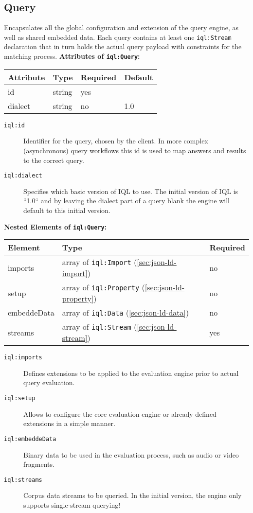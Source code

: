 \documentclass[11pt]{article}
\newcommand{\iql}{IQL\xspace}
\newcommand{\iqlns}{iql:}
\newcommand{\iqlType}[1]{\texttt{\iqlns#1}}
\newcommand{\desc}[1]{\noindent#1\newline\medskip}
\newenvironment{attributes}[1]{
\noindent\textbf{Attributes of #1:}\newline\medskip
\begin{tabular}{|p{0.3\textwidth}|p{0.20\textwidth}|p{0.20\textwidth}|p{0.17\textwidth}|}
	\hline
	\textbf{Attribute} & \textbf{Type} & \textbf{Required} & \textbf{Default} \\ 
	\hline
	\hline
}{
\end{tabular}
}
\newcommand{\attribute}[4]{
	#1 & #2 & #3 & #4 \\
	\hline
}
\newenvironment{elements}[1]{
\noindent\textbf{Nested Elements of #1:}\newline\medskip
\begin{tabular}{|p{0.3\textwidth}|p{0.42\textwidth}|p{0.17\textwidth}|}
	\hline
	\textbf{Element} & \textbf{Type} & \textbf{Required} \\ 
	\hline
	\hline
}{
\end{tabular}
}
\newcommand{\element}[3]{
#1 & #2 & #3 \\
\hline
}
\begin{document}
\subsection{Query}
\label{sec:json-ld-query}
\desc{Encapsulates all the global configuration and extension of the query engine, as well as shared embedded data. Each query contains at least one \iqlType{Stream} declaration that in turn holds the actual query payload with constraints for the matching process.}
\begin{attributes}{\iqlType{Query}}
	\attribute{id}{string}{yes}{}
	\attribute{dialect}{string}{no}{1.0}
\end{attributes}
\begin{description}
	\item[\iqlType{id}] Identifier for the query, chosen by the client. In more complex (asynchronous) query workflows this id is used to map answers and results to the correct query.
	\item[\iqlType{dialect}] Specifies which basic version of \iql to use. The initial version of \iql is ``1.0`` and by leaving the dialect part of a query blank the engine will default to this initial version.
\end{description}
\begin{elements}{\iqlType{Query}}
	\element{imports}{array of \iqlType{Import} (\ref{sec:json-ld-import})}{no}
	\element{setup}{array of \iqlType{Property} (\ref{sec:json-ld-property})}{no}
	\element{embeddeData}{array of \iqlType{Data} (\ref{sec:json-ld-data})}{no}
	\element{streams}{array of \iqlType{Stream} (\ref{sec:json-ld-stream})}{yes}
\end{elements}
\begin{description}
	\item[\iqlType{imports}] Defines extensions to be applied to the evaluation engine prior to actual query evaluation.
	\item[\iqlType{setup}] Allows to configure the core evaluation engine or already defined extensions in a simple manner.
	\item[\iqlType{embeddeData}] Binary data to be used in the evaluation process, such as audio or video fragments.
	\item[\iqlType{streams}] Corpus data streams to be queried. In the initial version, the engine only supports single-stream querying!
\end{description}
\end{document}
